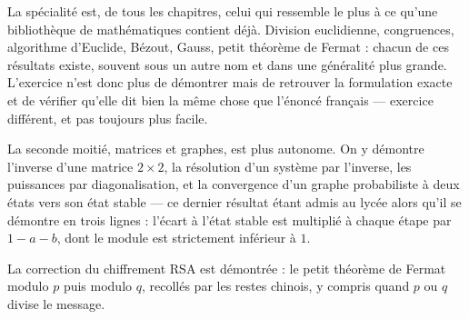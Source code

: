 La spécialité est, de tous les chapitres, celui qui ressemble le plus à ce qu'une bibliothèque
de mathématiques contient déjà. Division euclidienne, congruences, algorithme d'Euclide,
Bézout, Gauss, petit théorème de Fermat : chacun de ces résultats existe, souvent sous un
autre nom et dans une généralité plus grande. L'exercice n'est donc plus de démontrer mais de
retrouver la formulation exacte et de vérifier qu'elle dit bien la même chose que l'énoncé
français — exercice différent, et pas toujours plus facile.

La seconde moitié, matrices et graphes, est plus autonome. On y démontre l'inverse d'une
matrice $2 \times 2$, la résolution d'un système par l'inverse, les puissances par
diagonalisation, et la convergence d'un graphe probabiliste à deux états vers son état stable
— ce dernier résultat étant admis au lycée alors qu'il se démontre en trois lignes : l'écart à
l'état stable est multiplié à chaque étape par $1 - a - b$, dont le module est strictement
inférieur à $1$.

La correction du chiffrement RSA est démontrée : le petit théorème de Fermat modulo $p$ puis
modulo $q$, recollés par les restes chinois, y compris quand $p$ ou $q$ divise le message.
